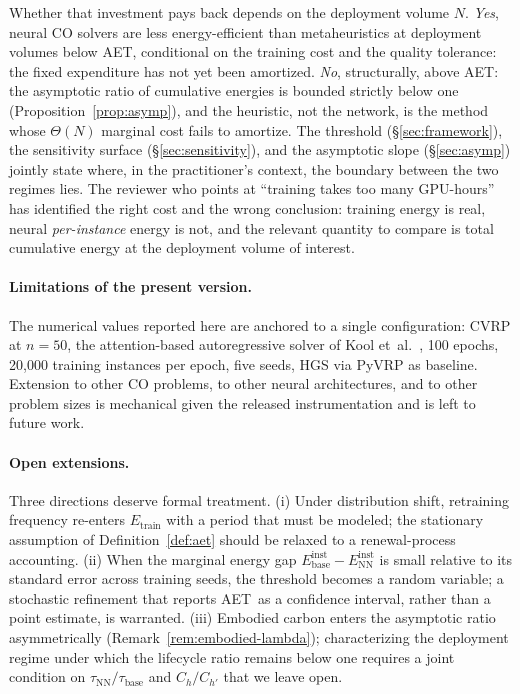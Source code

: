 \documentclass[11pt]{article}
\newcommand{\AET}{AET}
\begin{document}
Whether that investment pays back depends on the deployment volume \(N\). \emph{Yes}, neural CO solvers are less energy-efficient than metaheuristics at deployment volumes below \AET, conditional on the training cost and the quality tolerance: the fixed expenditure has not yet been amortized. \emph{No}, structurally, above \AET: the asymptotic ratio of cumulative energies is bounded strictly below one (Proposition~\ref{prop:asymp}), and the heuristic, not the network, is the method whose $\Theta(N)$ marginal cost fails to amortize. The threshold (\S\ref{sec:framework}), the sensitivity surface (\S\ref{sec:sensitivity}), and the asymptotic slope (\S\ref{sec:asymp}) jointly state where, in the practitioner's context, the boundary between the two regimes lies. The reviewer who points at ``training takes too many GPU-hours'' has identified the right cost and the wrong conclusion: training energy is real, neural \emph{per-instance} energy is not, and the relevant quantity to compare is total cumulative energy at the deployment volume of interest.

\paragraph{Limitations of the present version.} The numerical values reported here are anchored to a single configuration: CVRP at \(n=50\), the attention-based autoregressive solver of Kool et~al.~\cite{kool2019attention}, 100 epochs, 20{,}000 training instances per epoch, five seeds, HGS via PyVRP as baseline. Extension to other CO problems, to other neural architectures, and to other problem sizes is mechanical given the released instrumentation and is left to future work.

\paragraph{Open extensions.} Three directions deserve formal
treatment. (i) Under distribution shift, retraining frequency re-enters \(E_\text{train}\) with a period that must be modeled; the stationary assumption of Definition~\ref{def:aet} should be relaxed to a renewal-process accounting. (ii) When the marginal energy gap \(E_\text{base}^\text{inst} - E_\text{NN}^\text{inst}\) is small relative to its standard error across training seeds, the threshold becomes a random variable; a stochastic refinement that reports \AET\ as a confidence interval, rather than a point estimate, is warranted. (iii) Embodied carbon enters the asymptotic ratio asymmetrically (Remark~\ref{rem:embodied-lambda}); characterizing the deployment regime under which the lifecycle ratio remains below one requires a joint condition on \(\tau_\text{NN}/\tau_\text{base}\) and \(C_h/C_{h'}\) that we leave open.
\end{document}
